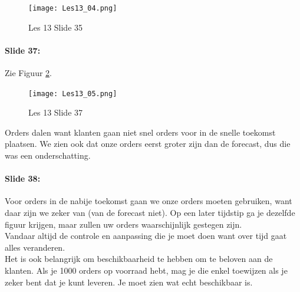 \documentclass[10pt,a4paper]{report}
\begin{document}
\begin{figure}[h!]
\centering
\texttt{[image: Les13\_04.png]}
\caption{Les 13 Slide 35} 
\label{les13_04}
\end{figure}

\paragraph{Slide 37:} Zie Figuur \ref{les13_05}.\\

\begin{figure}[h!]
\centering
\texttt{[image: Les13\_05.png]}
\caption{Les 13 Slide 37} 
\label{les13_05}
\end{figure}

Orders dalen want klanten gaan niet snel orders voor in de snelle toekomst plaatsen. We zien ook dat onze orders eerst groter zijn dan de forecast, dus die was een onderschatting.

\paragraph{Slide 38:} Voor orders in de nabije toekomst gaan we onze orders moeten gebruiken, want daar zijn we zeker van (van de forecast niet). Op een later tijdstip ga je dezelfde figuur krijgen, maar zullen uw orders waarschijnlijk gestegen zijn.\\
Vandaar altijd de controle en aanpassing die je moet doen want over tijd gaat alles veranderen.\\
Het is ook belangrijk om beschikbaarheid te hebben om te beloven aan de klanten. Als je 1000 orders op voorraad hebt, mag je die enkel toewijzen als je zeker bent dat je kunt leveren. Je moet zien wat echt beschikbaar is.
\end{document}
